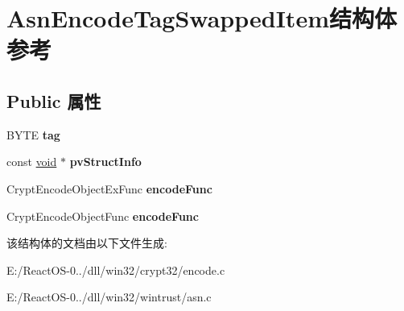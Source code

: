 \hypertarget{struct_asn_encode_tag_swapped_item}{}\section{Asn\+Encode\+Tag\+Swapped\+Item结构体 参考}
\label{struct_asn_encode_tag_swapped_item}
\subsection*{Public 属性}
\begin{DoxyCompactItemize}
\item 
\mbox{\label{struct_asn_encode_tag_swapped_item_a7cae03a3ac51061bdf68da99a8c2343c}} 
B\+Y\+TE {\bfseries tag}
\item 
\mbox{\label{struct_asn_encode_tag_swapped_item_ab801a696faf258ce07c3580086a30665}} 
const \hyperlink{interfacevoid}{void} $\ast$ {\bfseries pv\+Struct\+Info}
\item 
\mbox{\label{struct_asn_encode_tag_swapped_item_ab9cc1ae5584ab17bb4d08a3c3465e828}} 
Crypt\+Encode\+Object\+Ex\+Func {\bfseries encode\+Func}
\item 
\mbox{\label{struct_asn_encode_tag_swapped_item_a560bf573f040a5d5672f79610c7a1bed}} 
Crypt\+Encode\+Object\+Func {\bfseries encode\+Func}
\end{DoxyCompactItemize}


该结构体的文档由以下文件生成\+:\begin{DoxyCompactItemize}
\item 
E\+:/\+React\+O\+S-\/0../dll/win32/crypt32/encode.\+c\item 
E\+:/\+React\+O\+S-\/0../dll/win32/wintrust/asn.\+c\end{DoxyCompactItemize}
